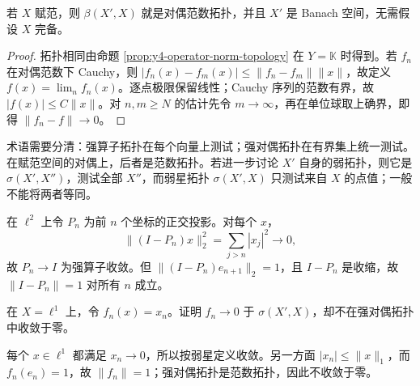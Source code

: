 \begin{theorem}\label{thm:y4-dual-banach}
若 $X$ 赋范，则 $\beta(X',X)$ 就是对偶范数拓扑，并且 $X'$ 是 Banach 空间，无需假设 $X$ 完备。
\end{theorem}
\begin{proof}
拓扑相同由命题 \ref{prop:y4-operator-norm-topology} 在 $Y=\mathbb K$ 时得到。若 $f_n$ 在对偶范数下 Cauchy，则 $|f_n(x)-f_m(x)|\le\|f_n-f_m\|\|x\|$，故定义 $f(x)=\lim_nf_n(x)$。逐点极限保留线性；Cauchy 序列的范数有界，故 $|f(x)|\le C\|x\|$。对 $n,m\ge N$ 的估计先令 $m\to\infty$，再在单位球取上确界，即得 $\|f_n-f\|\to0$。
\end{proof}

术语需要分清：强算子拓扑在每个向量上测试；强对偶拓扑在有界集上统一测试。在赋范空间的对偶上，后者是范数拓扑。若进一步讨论 $X'$ 自身的弱拓扑，则它是 $\sigma(X',X'')$，测试全部 $X''$，而弱星拓扑 $\sigma(X',X)$ 只测试来自 $X$ 的点值；一般不能将两者等同。

\begin{example}[逐点收敛不推出范数收敛]
在 $\ell^2$ 上令 $P_n$ 为前 $n$ 个坐标的正交投影。对每个 $x$，
\[
 \|(I-P_n)x\|_2^2=\sum_{j>n}|x_j|^2\to0,
\]
故 $P_n\to I$ 为强算子收敛。但 $\|(I-P_n)e_{n+1}\|_2=1$，且 $I-P_n$ 是收缩，故 $\|I-P_n\|=1$ 对所有 $n$ 成立。
\end{example}

\begin{exercise}
在 $X=\ell^1$ 上，令 $f_n(x)=x_n$。证明 $f_n\to0$ 于 $\sigma(X',X)$，却不在强对偶拓扑中收敛于零。
\end{exercise}
\begin{solution}
每个 $x\in\ell^1$ 都满足 $x_n\to0$，所以按弱星定义收敛。另一方面 $|x_n|\le\|x\|_1$，而 $f_n(e_n)=1$，故 $\|f_n\|=1$；强对偶拓扑是范数拓扑，因此不收敛于零。
\end{solution}
